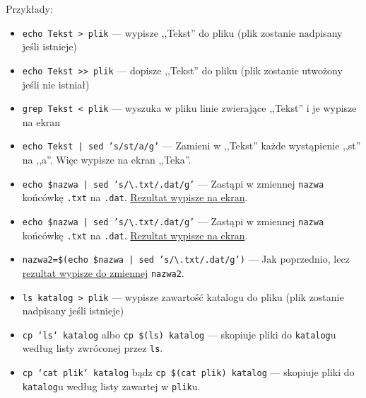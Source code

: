 \documentclass{instrukcja}
\begin{document}
Przykłady:
\begin{itemize}
\item {\tt echo Tekst {\blue > plik}} --- wypisze ,,Tekst'' do {\blue plik}u ({\blue plik} zostanie nadpisany jeśli istnieje)
\item {\tt echo Tekst {\blue >> plik}} --- dopisze ,,Tekst'' do {\blue plik}u ({\blue plik} zostanie utwożony jeśli nie istniał)
\item {\tt grep Tekst {\blue < plik}} --- wyszuka w {\blue plik}u linie zwierające {\green ,,Tekst''} i je wypisze na ekran
\item {\tt echo Tekst {\blue |} sed 's/st/a/g'} --- Zamieni w ,,Tekst'' każde wystąpienie ,,st'' na ,,a''. Więc wypisze na ekran ,,Teka''.
\item {\tt echo \$nazwa {\blue |} sed 's/\textbackslash{}.txt/.dat/g'} --- Zastąpi w zmiennej {\tt nazwa} końcówkę {\tt .txt} na {\tt .dat}. \uline{Rezultat wypisze na ekran}.
\item {\tt echo \$nazwa {\blue |} sed 's/\textbackslash{}.txt/.dat/g'} --- Zastąpi w zmiennej {\tt nazwa} końcówkę {\tt .txt} na {\tt .dat}. \uline{Rezultat wypisze na ekran}.
\item {\tt nazwa2={\blue \$(}echo \$nazwa {\blue |} sed 's/\textbackslash{}.txt/.dat/g'{\blue )}} --- Jak poprzednio, lecz \uline{rezultat wypisze do zmiennej} {\tt nazwa2}.
\item {\tt ls katalog {\blue > plik}} --- wypisze zawartość {\green katalog}u do {\blue plik}u ({\blue plik} zostanie nadpisany jeśli istnieje)
\item {\tt cp {\blue `}ls{\blue `} katalog} albo {\tt cp {\blue \$(}ls{\blue )} katalog} --- skopiuje pliki do {\tt katalog}u według listy zwróconej przez {\tt ls}.
\item {\tt cp {\blue `}cat plik{\blue `} katalog} bądz {\tt cp {\blue \$(}cat plik{\blue )} katalog} --- skopiuje pliki do {\tt katalog}u według listy zawartej w {\tt plik}u.
\end{itemize}
\end{document}

